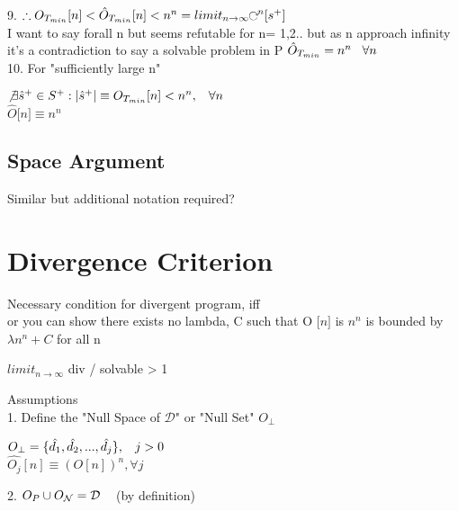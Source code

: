 \documentclass[11pt]{article}
\def \nestedloop {\ensuremath{\rotatebox[origin=c]{-90}{$\circlearrowright$}}^n}
\begin{document}
9. $\therefore  O_{T_{min}}\lbrack n \rbrack < \hat{O}_{T_{min}} \lbrack n \rbrack < n^n  =  limit_{n \rightarrow \infty} \nestedloop \lbrack s^{+} \rbrack$
\\
I want to say forall n but seems refutable for n= 1,2.. but as n approach infinity it's a contradiction to say a solvable problem in P $\hat{O}_{T_{min}} = n^n \hspace{3mm} \forall n$\\
10. For "sufficiently large n"
\begin{center}
$
\not \exists \hat{s}^{+} \in S^{+} : | \hat{s}^{+} | \equiv O_{T_{min}} \lbrack n \rbrack <  n^n, \hspace{3mm} \forall n
$
\\
$
\hat{O} \lbrack n \rbrack \equiv n^n
$
\end{center}

\subsection{Space Argument}
Similar but additional notation required?






\newpage
\section{Divergence Criterion}
Necessary condition for divergent program, iff\\
 or you can show there exists no lambda, C such that O $\lbrack n \rbrack$ is $n^n$ is bounded by $\lambda n^n + C$ for all n

$limit_{n \rightarrow \infty}$ div / solvable > 1

Assumptions\\
1. Define the "Null Space of $\mathcal{D}$" or "Null Set" $O_\perp$
\begin{center}
$
O_\perp = \{\hat{d_1},\hat{d_2},...,\hat{d_j}\}, \hspace{3mm} j > 0
$
\\
$
 \hat{O_j} [n] \equiv (O[n])^n, \forall j
$
\end{center}
2. $O_P \cup O_\mathcal{N} =\mathcal{D} \hspace{3mm}$ (by definition)\\
\end{document}
